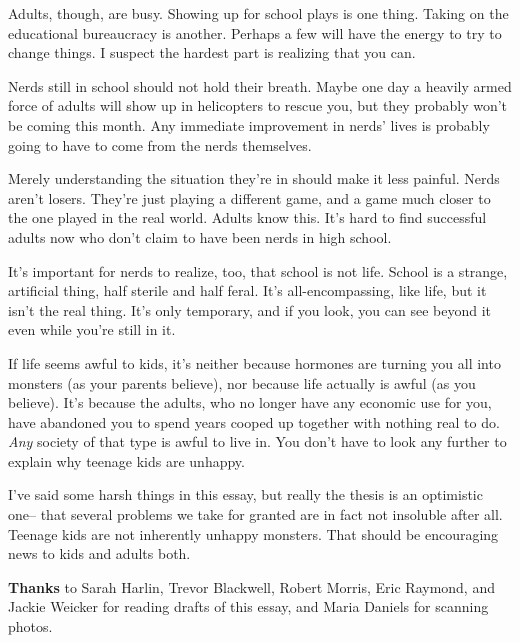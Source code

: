 Adults, though, are busy. Showing up for school plays is one thing.
Taking on the educational bureaucracy is another. Perhaps a few will
have the energy to try to change things. I suspect the hardest part is
realizing that you can.

Nerds still in school should not hold their breath. Maybe one day a
heavily armed force of adults will show up in helicopters to rescue you,
but they probably won't be coming this month. Any immediate improvement
in nerds' lives is probably going to have to come from the nerds
themselves.

Merely understanding the situation they're in should make it less
painful. Nerds aren't losers. They're just playing a different game, and
a game much closer to the one played in the real world. Adults know
this. It's hard to find successful adults now who don't claim to have
been nerds in high school.

It's important for nerds to realize, too, that school is not life.
School is a strange, artificial thing, half sterile and half feral. It's
all-encompassing, like life, but it isn't the real thing. It's only
temporary, and if you look, you can see beyond it even while you're
still in it.

If life seems awful to kids, it's neither because hormones are turning
you all into monsters (as your parents believe), nor because life
actually is awful (as you believe). It's because the adults, who no
longer have any economic use for you, have abandoned you to spend years
cooped up together with nothing real to do. \emph{Any} society of that
type is awful to live in. You don't have to look any further to explain
why teenage kids are unhappy.

I've said some harsh things in this essay, but really the thesis is an
optimistic one-- that several problems we take for granted are in fact
not insoluble after all. Teenage kids are not inherently unhappy
monsters. That should be encouraging news to kids and adults both.

\textbf{Thanks} to Sarah Harlin, Trevor Blackwell, Robert Morris, Eric
Raymond, and Jackie Weicker for reading drafts of this essay, and Maria
Daniels for scanning photos.
